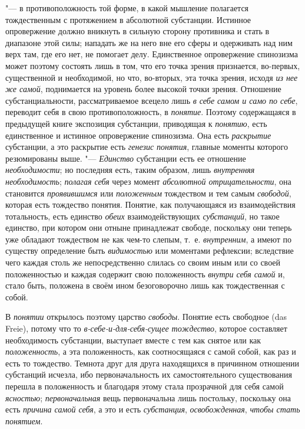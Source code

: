 {"--- в противоположность той форме, в какой мышление полагается
тождественным с протяжением в абсолютной субстанции. Истинное опровержение
должно вникнуть в сильную сторону противника и стать в
диапазоне этой силы; нападать же на него вне его сферы и одерживать над ним
верх там, где его нет, не помогает делу. Единственное опровержение
спинозизма может поэтому состоять лишь в том, что его точка зрения
признается, во-первых, существенной и необходимой, но что, во-вторых, эта
точка зрения, исходя {\em из нее же самой}, поднимается на уровень более
высокой точки зрения. Отношение субстанциальности, рассматриваемое всецело
лишь {\em в себе самом и само по себе}, переводит себя в свою
противоположность, в {\em понятие}. Поэтому содержащаяся в предыдущей книге
экспозиция субстанции, приводящая к {\em понятию}, есть единственное и
истинное опровержение спинозизма. Она есть {\em раскрытие} субстанции, а это
раскрытие есть {\em генезис понятия}, главные моменты которого резюмированы
выше. "--- {\em Единство} субстанции есть ее отношение {\em необходимости};
но последняя есть, таким образом, лишь {\em внутренняя необходимость};
{\em полагая себя} через момент {\em абсолютной отрицательности}, она
становится {\em проявившимся} или {\em положенным} тождеством и тем самым
{\em свободой}, которая есть тождество понятия. Понятие, как получающаяся из
взаимодействия тотальность, есть единство {\em обеих} взаимодействующих
{\em субстанций}, но такое единство, при котором они отныне принадлежат
свободе, поскольку они теперь уже обладают тождеством не как чем-то слепым,
т.~е. {\em внутренним}, а имеют по существу определение быть {\em видимостью}
или моментами рефлексии; вследствие чего каждая столь же непосредственно
слилась со своим иным или со своей положенностью и каждая содержит свою
положенность {\em внутри себя самой} и, стало быть, положена в своём ином
безоговорочно лишь как тождественная с собой.

В {\em понятии} открылось поэтому царство {\em свободы}. Понятие есть
свободное (das Freie), потому что то {\em в-себе-и-для-себя-сущее тождество},
которое составляет необходимость субстанции, выступает вместе с тем как
снятое или как {\em положенность}, а эта положенность, как соотносящаяся с
самой собой, как раз и есть то тождество. Темнота друг для друга находящихся
в причинном отношении субстанций исчезла, ибо первоначальность их
самостоятельного существования перешла в положенность и благодаря этому
стала прозрачной для себя самой {\em ясностью}; {\em первоначальная}
вещь
первоначальна лишь постольку, поскольку она есть {\em причина самой себя},
а это и есть {\em субстанция}, {\em освобожденная}, {\em чтобы стать понятием}.

}
